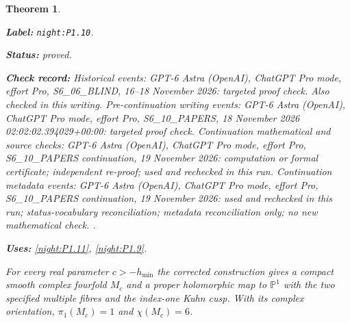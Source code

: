 \documentclass[11pt,a4paper]{article}
\newtheorem{theorem}{Theorem}[section]
\theoremstyle{definition}
\newcommand{\StatementRecord}[4]{\par\smallskip\begingroup\upshape\raggedright\noindent\textbf{Label:} \nolinkurl{#1}.\par\noindent\textbf{Status:} #2.\par\noindent\textbf{Check record:} #3.\par\noindent\textbf{Uses:} #4.\par\endgroup\smallskip}
\begin{document}
\begin{theorem}\label{night:P1.10}
\StatementRecord{night:P1.10}{proved}{Historical events: GPT-6 Astra (OpenAI), ChatGPT Pro mode, effort Pro, S6\_06\_BLIND, 16--18 November 2026: targeted proof check. Also checked in this writing. Pre-continuation writing events: GPT-6 Astra (OpenAI), ChatGPT Pro mode, effort Pro, S6\_10\_PAPERS, 18 November 2026 02:02:02.394029+00:00: targeted proof check. Continuation mathematical and source checks: GPT-6 Astra (OpenAI), ChatGPT Pro mode, effort Pro, S6\_10\_PAPERS continuation, 19 November 2026: computation or formal certificate; independent re-proof; used and rechecked in this run. Continuation metadata events: GPT-6 Astra (OpenAI), ChatGPT Pro mode, effort Pro, S6\_10\_PAPERS continuation, 19 November 2026: used and rechecked in this run; status-vocabulary reconciliation; metadata reconciliation only; no new mathematical check. }{\cref{night:P1.11}, \cref{night:P1.9}}
For every real parameter $c>-h_{\min}$ the corrected construction gives
a compact smooth complex fourfold $M_c$ and a proper holomorphic map
to $\mathbb P^1$ with the two specified multiple fibres and the
index-one Kuhn cusp.  With its complex orientation,
$\pi_1(M_c)=1$ and $\chi(M_c)=6$.
\end{theorem}
\end{document}
